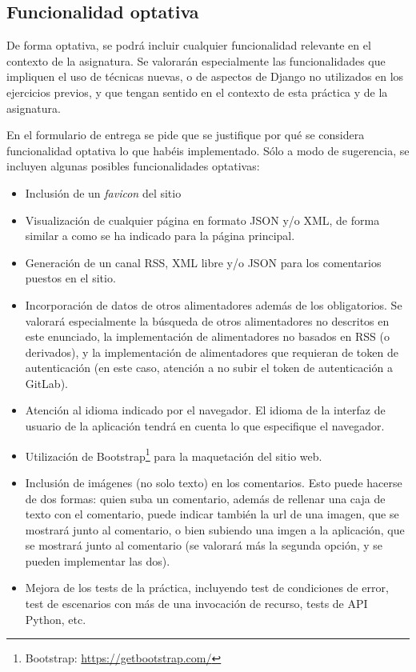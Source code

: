 \subsection{Funcionalidad optativa}

De forma optativa, se podrá incluir cualquier funcionalidad relevante en el contexto de la asignatura. Se valorarán especialmente las funcionalidades que impliquen el uso de técnicas nuevas, o de aspectos de Django no utilizados en los ejercicios previos, y que tengan sentido en el contexto de esta práctica y de la asignatura.

En el formulario de entrega se pide que se justifique por qué se considera funcionalidad optativa lo que habéis implementado. Sólo a modo de sugerencia, se incluyen algunas posibles funcionalidades optativas:

\begin{itemize}
  \item Inclusión de un \emph{favicon} del sitio
  
  \item Visualización de cualquier página en formato JSON y/o XML, de forma similar a como se ha indicado para la página principal.

  \item Generación de un canal RSS, XML libre y/o JSON para los comentarios puestos en el sitio.

  \item Incorporación de datos de otros alimentadores además de los obligatorios. Se valorará especialmente la búsqueda de otros alimentadores no descritos en este enunciado, la implementación de alimentadores no basados en RSS (o derivados), y la implementación de alimentadores que requieran de token de autenticación (en este caso, atención a no subir el token de autenticación a GitLab).
 
  \item Atención al idioma indicado por el navegador. El idioma de la interfaz de usuario de la aplicación tendrá en cuenta lo que especifique el navegador.

  \item Utilización de Bootstrap\footnote{Bootstrap: \url{https://getbootstrap.com/}} para la maquetación del sitio web.

  \item Inclusión de imágenes (no solo texto) en los comentarios. Esto puede hacerse de dos formas: quien suba un comentario, además de rellenar una caja de texto con el comentario, puede indicar también la url de una imagen, que se mostrará junto al comentario, o bien subiendo una imgen a la aplicación, que se mostrará junto al comentario (se valorará más la segunda opción, y se pueden implementar las dos).
    
  \item Mejora de los tests de la práctica, incluyendo test de condiciones de error, test de escenarios con más de una invocación de recurso, tests de API Python, etc.
\end{itemize}

